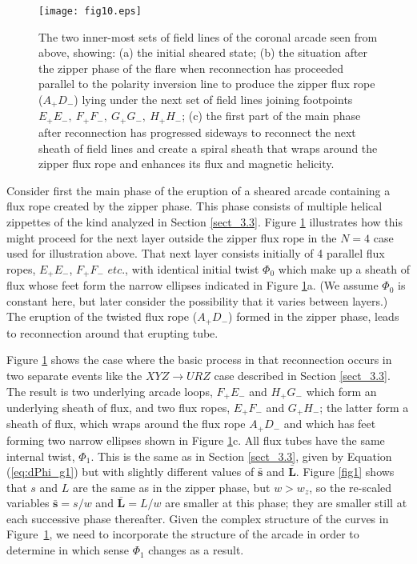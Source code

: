 \documentclass[10pt,namedreferneces]{SolarPhysics}
\begin{document}
\begin{article}
\begin{figure}[h]
{\centering
 \texttt{[image: fig10.eps]}
\caption{The two inner-most sets of field lines of the coronal arcade seen from above, showing: (a) the initial sheared state; (b) the situation after the zipper phase of the flare when reconnection has proceeded parallel to the polarity inversion line to produce the zipper flux rope ($A_+D_-$) lying under the next set of field lines joining footpoints $E_+E_-,\ F_+F_-,\ G_+G_-,\ H_+H_-$; (c) the first part of the main phase after reconnection has progressed sideways to reconnect the next sheath of field lines and create a spiral sheath that wraps around the zipper flux rope and enhances its flux and magnetic helicity.}
\label{fig10}}
\end{figure}
Consider first the main phase of the eruption of a sheared arcade containing a flux rope created by the zipper phase. This phase  consists of multiple helical zippettes of the kind  analyzed in Section \ref{sect_3.3}.  Figure \ref{fig10} illustrates how this might proceed for the next layer outside the zipper flux rope in the $N=4$ case used for illustration above.  That next layer consists initially of 4 parallel flux ropes, $E_+E_-$, $F_+F_-$ $etc.$, with identical initial twist $\Phi_0$ which make up a sheath of flux whose feet form the narrow ellipses indicated in Figure \ref{fig10}a. (We assume $\Phi_0$ is constant here, but later consider the possibility that it varies between layers.)  The eruption of the twisted flux rope ($A_+D_-$) formed in the zipper phase, leads to reconnection around that erupting tube.  

Figure \ref{fig10} shows the case where the basic process in that reconnection occurs in two separate events like the $XYZ\to URZ$ case described in Section \ref{sect_3.3}.  The result is two underlying arcade loops, $F_+E_-$ and $H_+G_-$ which form an underlying sheath of flux, and two flux ropes, $E_+F_-$ and $G_+H_-$; the latter form a sheath of flux, which wraps around the flux rope $A_+D_-$ and which has feet forming two narrow ellipses shown in Figure \ref{fig10}c.  All flux tubes have the same internal twist, $\Phi_1$.  This is the same as in Section \ref{sect_3.3}, given by Equation  (\ref{eq:dPhi_g1}) but with slightly different values of $\bm\bar{s}$ and $\bm\bar{L}$.   Figure \ref{fig1} shows that $s$ and $L$ are the same as in the zipper phase, but $w>w_z$, so the re-scaled variables $\bm\bar{s}=s/w$ and $\bm\bar{L}=L/w$ are smaller at this phase; they are smaller still at each successive phase thereafter.  Given the complex structure of the curves in Figure\ \ref{fig10}, we need to incorporate the structure of the arcade in order to determine in which sense $\Phi_1$  changes as a result.


\end{article}
\end{document}
